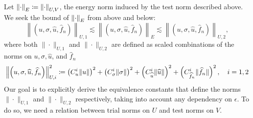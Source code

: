 Let $\nor{\cdot}_E \coloneqq \nor{\cdot}_{U,V}$, the energy norm induced by the test norm described above. We seek the bound of $\nor{\cdot}_E$ from above and below:
\[
\left\| \left(u,\sigma,\widehat{u},\widehat{f}_n\right)\right \|_{U,1} \lesssim  \left\| \left(u,\sigma,\widehat{u},\widehat{f}_n\right)\right \|_E \lesssim \left\| \left(u,\sigma,\widehat{u},\widehat{f}_n\right)\right \|_{U,2},
\]
where both $\|\cdot\|_{U,1}$ and $\|\cdot\|_{U,2}$ are defined as scaled combinations of the norms on $u, \sigma, \widehat{u}$, and $\widehat{f}_n$
\begin{equation}
\eqnlab{uNorms}
\left\| \left(u,\sigma,\widehat{u},\widehat{f}_n\right)\right \|_{U,i}^2 \coloneqq \left(C_u^i\|u\|\right)^2 + \left(C_\sigma^i\|\sigma\|\right)^2 + \left(C_{\widehat{u}}^i\|\widehat{u}\|\right)^2 + \left(C_{\widehat{f}_n}^i\|\widehat{f}_n\|\right)^2,\quad i = 1,2
\end{equation}
Our goal is to explicitly derive the equivalence constants 
that define the norms $\|\cdot\|_{U,1}$ and $\|\cdot\|_{U,2}$ respectively, taking into account any dependency on $\epsilon$. To do so, we need a relation between trial norms on $U$ and test norms on $V$.

